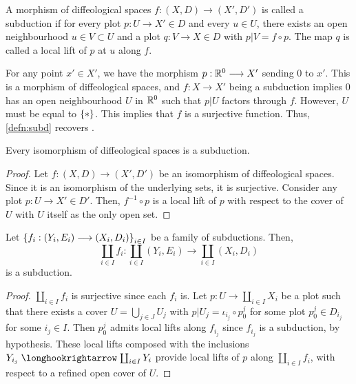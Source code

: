 \documentclass[11pt]{amsart}
\begin{document}
\begin{defn}[Subduction]\label{defn:subd}
A morphism of diffeological spaces $f : (X, D) \to (X', D')$ is called a subduction
if for every plot $p : U \to X' \in D$ and every $u \in U$, there exists
an open neighbourhood $u \in V \subset U$ and a plot $q : V \to X \in D$ with $p|V = f \circ p$.
The map $q$ is called a local lift of $p$ at $u$ along $f$.
\end{defn}

\begin{rmk}
For any point $x' \in X'$, we have the
morphism $p : \bR^0 \to X'$ sending $0$ to $x'$. This is a morphism of diffeological spaces,
and $f : X \to X'$ being a subduction implies $0$ has an open neighbourhood $U$ in $\mathbb{R}^0$
such that $p|U$ factors through $f$. However, $U$ must be equal to $\set{*}$. This implies that
$f$ is a surjective function. Thus, \cref{defn:subd} recovers \cite[\S 1.48]{Diff}.
\end{rmk}

\begin{prop}\label{prop:subd-iso}
Every isomorphism of diffeological spaces is a subduction.
\end{prop}
\begin{proof}
Let $f : (X, D) \to (X', D')$ be an isomorphism of diffeological spaces.
Since it is an isomorphism of the underlying sets, it is surjective.
Consider any plot $p : U \to X' \in D'$.
Then, $f^{-1} \circ p$ is a local lift of $p$ with respect to the cover of $U$ with
$U$ itself as the only open set.
\end{proof}

\begin{prop}\label{prop:subd-coprod}
Let $\set{f_i : (Y_i, E_i) \to (X_i, D_i)}_{i \in I}$ be a family of subductions. Then,
\[
\coprod_{i \in I} f_i : \coprod_{i \in I} (Y_i, E_i) \to \coprod_{i \in I} (X_i, D_i)
\]
is a subduction.
\end{prop}
\begin{proof}
$\coprod_{i \in I} f_i$ is surjective since each $f_i$ is.
Let $p : U \to \coprod_{i \in I} X_i$ be a plot such that there exists a cover
$U = \bigcup_{j \in J} U_j$ with $p|U_j = \iota_{i_j} \circ p^j_0$ for some plot
$p^j_0 \in D_{i_j}$ for some $i_j \in I$. Then $p^j_0$ admits local lifts along
$f_{i_j}$ since $f_{i_j}$ is a subduction, by hypothesis. These local lifts composed with
the inclusions $Y_{i_j} \hto \coprod_{i \in I} Y_i$ provide local lifts of $p$
along $\coprod_{i \in I} f_i$, with respect to a refined open cover of $U$.
\end{proof}
\end{document}

